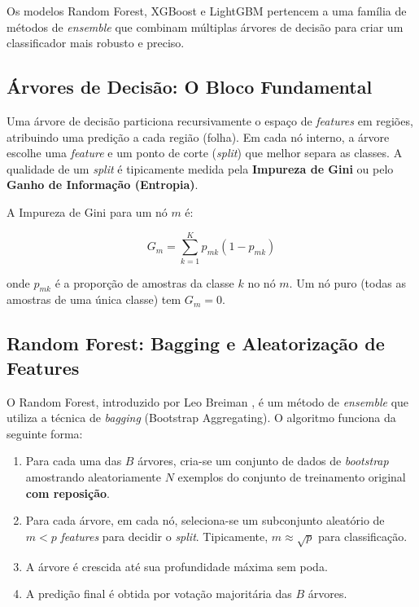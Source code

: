 \documentclass[12pt, a4paper, oneside]{report}
\begin{document}
Os modelos Random Forest, XGBoost e LightGBM pertencem a uma família de métodos de \textit{ensemble} que combinam múltiplas árvores de decisão para criar um classificador mais robusto e preciso.

\subsection{Árvores de Decisão: O Bloco Fundamental}

Uma árvore de decisão particiona recursivamente o espaço de \textit{features} em regiões, atribuindo uma predição a cada região (folha). Em cada nó interno, a árvore escolhe uma \textit{feature} e um ponto de corte (\textit{split}) que melhor separa as classes. A qualidade de um \textit{split} é tipicamente medida pela \textbf{Impureza de Gini} ou pelo \textbf{Ganho de Informação (Entropia)}.

A Impureza de Gini para um nó $m$ é:

\begin{equation}
    G_m = \sum_{k=1}^K p_{mk}(1 - p_{mk})
\end{equation}

onde $p_{mk}$ é a proporção de amostras da classe $k$ no nó $m$. Um nó puro (todas as amostras de uma única classe) tem $G_m = 0$.

\subsection{Random Forest: Bagging e Aleatorização de Features}

O Random Forest, introduzido por Leo Breiman \cite{breiman2001}, é um método de \textit{ensemble} que utiliza a técnica de \textit{bagging} (Bootstrap Aggregating). O algoritmo funciona da seguinte forma:

\begin{enumerate}
    \item Para cada uma das $B$ árvores, cria-se um conjunto de dados de \textit{bootstrap} amostrando aleatoriamente $N$ exemplos do conjunto de treinamento original \textbf{com reposição}.
    \item Para cada árvore, em cada nó, seleciona-se um subconjunto aleatório de $m < p$ \textit{features} para decidir o \textit{split}. Tipicamente, $m \approx \sqrt{p}$ para classificação.
    \item A árvore é crescida até sua profundidade máxima sem poda.
    \item A predição final é obtida por votação majoritária das $B$ árvores.
\end{enumerate}
\end{document}
